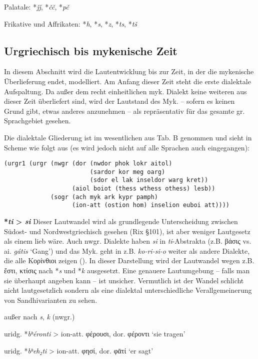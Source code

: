 \documentclass[12pt,a4paper,normalheadings,bibliography=totoc]{scrartcl}
\newcounter{para}
\newcommand{\mypara}[1]{\vspace{1em}\par\noindent\refstepcounter{para}%
\textbf{\textsf{\thepara}}\enspace\textbf{#1}\quad}
\def\rek#1{\mbox{*\textit{#1}}}
\def\bel#1{\mbox{\textit{#1}}}
\def\i#1{\mbox{\textit{#1}}}
\begin{document}
\noindent
Palatale: \rek{ǰǰ}, \rek{čč}, \rek{pč}

\noindent
Frikative und Affrikaten: \rek{h}, \rek{s}, \rek{z}, \rek{ts}, \rek{tš}

\subsection{Urgriechisch bis mykenische Zeit}

In diesem Abschnitt wird die Lautentwicklung bis zur Zeit,
in der die mykenische Überlieferung endet, modelliert.
Am Anfang dieser Zeit steht die erste dialektale Aufspaltung.
Da außer dem recht einheitlichen myk. Dialekt keine weiteren aus dieser
Zeit überliefert sind,
wird der Lautstand des Myk.
-- sofern es keinen Grund gibt, etwas anderes anzunehmen --
als repräsentativ für das gesamte gr. Sprachgebiet gesehen.

Die dialektale Gliederung ist im wesentlichen aus \cite{bart_frueh}
Tab. B genommen und sieht in Scheme wie folgt aus
(es wird jedoch nicht auf alle Sprachen auch eingegangen):
\begin{verbatim}
(urgr1 (urgr (nwgr (dor (nwdor phok lokr aitol)
                        (sardor kor meg oarg)
                        (sdor el lak inseldor warg kret))
                   (aiol boiot (thess wthess othess) lesb))
             (sogr (ach myk ark kypr pamph)
                   (ion-att (ostion hom) inselion euboi att))))
\end{verbatim}

\mypara{\rek{ti} > \bel{si}}
Dieser Lautwandel wird als grundlegende Unterscheidung zwischen Südost-
und Nordwestgriechisch gesehen (Rix §101),
ist aber weniger Lautgesetz als einem lieb wäre.
Auch nwgr. Dialekte haben \bel{si} in \emph{ti}-Abstrakta (z.B. βάσις vs. ai. \bel{gátis} `Gang')
und das Myk. geht in z.B. \bel{ko-ri-si-o} weiter als andere Dialekte,
die alle Κορίνθιοι zeigen (\cite[144]{bart_hand}).
In dieser Darstellung wird der Lautwandel wegen z.B. ἔστι, κτίσις
nach \rek{s} und \rek{k} ausgesetzt.
Eine genauere Lautumgebung -- falls man sie überhaupt angeben kann --
ist unsicher.
Vermutlich ist der Wandel schlicht nicht lautgesetzlich
sondern als eine dialektal unterschiedliche
Verallgemeinerung von Sandhivarianten zu sehen.

\lex{\i{t}}{\i{s}}{\_\i{i}} außer nach \i{s}, \i{k} (nwgr.)

uridg. \rek{bʰéronti} > ion-att. φέρουσι, dor. φέροντι `sie tragen'

uridg. \rek{bʰeh₂ti} > ion-att. φησί, dor. φᾱτί `er sagt'
\end{document}
